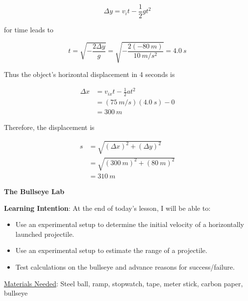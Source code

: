 \documentclass[../main-physics-workbook.tex]{subfiles}
\begin{document}
\begin{questions}
\begin{solutionorbox}[5cm]
\begin{equation*}
    \Delta y = v_i t - \frac{1}{2} g t^2
\end{equation*}

for time leads to

\begin{equation*}
    t = \sqrt{-\frac{2\Delta y}{g}} = \sqrt{-\frac{2(-\SI{80}{m})}{\SI{10}{m/s^2}}} = \SI{4.0}{s}
\end{equation*}

Thus the object's horizontal displacement in 4 seconds is

\begin{align*}
    \Delta x &= v_{ix} t - \frac{1}{2} a t^2 \\[1ex]
    &= (\SI{75}{m/s})(\SI{4.0}{s}) - 0 \\[1ex]
    &= \SI{300}{m}
\end{align*}

Therefore, the displacement is

\begin{align*}
    s &= \sqrt{\left(\Delta x\right)^2 + \left(\Delta y\right)^2} \\[1ex]
    &= \sqrt{\left(\SI{300}{m}\right)^2 + \left(\SI{80}{m}\right)^2} \\[1ex]
    &= \boxed{\SI{310}{m}}
\end{align*}
\end{solutionorbox}
\end{questions}


\clearpage

{\hfill \large \textbf{The Bullseye Lab} \hfill}

\bigskip

\noindent \textbf{Learning Intention}: At the end of today's lesson, I will be able to:

\begin{itemize}[itemsep=0pt,topsep=2pt]
    \item Use an experimental setup to determine the initial velocity of a horizontally launched projectile.
    \item Use an experimental setup to estimate the range of a projectile.
    \item Test  calculations on the bullseye and advance reasons for success/failure.
\end{itemize}

\medskip

\noindent  \underline{Materials Needed}: Steel ball, ramp, stopwatch, tape, meter stick, carbon paper, bullseye
\end{document}
